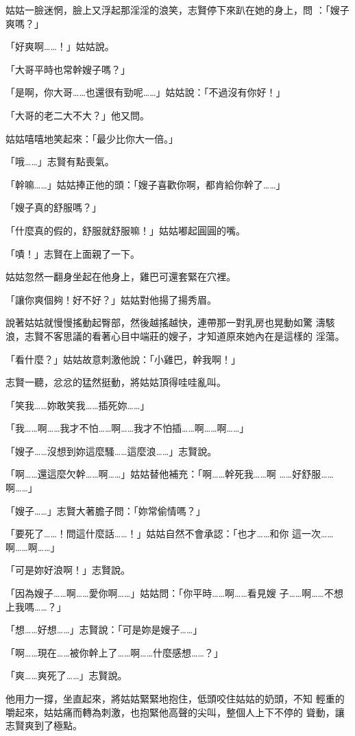 姑姑一臉迷惘，臉上又浮起那淫淫的浪笑，志賢停下來趴在她的身上，問
：「嫂子爽嗎？」

「好爽啊……！」姑姑說。

「大哥平時也常幹嫂子嗎？」

「是啊，你大哥……也還很有勁呢……」姑姑說：「不過沒有你好！」

「大哥的老二大不大？」他又問。

姑姑嘻嘻地笑起來：「最少比你大一倍。」

「哦……」志賢有點喪氣。

「幹嘛……」姑姑捧正他的頭：「嫂子喜歡你啊，都肯給你幹了……」

「嫂子真的舒服嗎？」

「什麼真的假的，舒服就舒服嘛！」姑姑嘟起圓圓的嘴。

「嘖！」志賢在上面親了一下。

姑姑忽然一翻身坐起在他身上，雞巴可還套緊在穴裡。

「讓你爽個夠！好不好？」姑姑對他揚了揚秀眉。

說著姑姑就慢慢搖動起臀部，然後越搖越快，連帶那一對乳房也晃動如驚
濤駭浪，志賢不客思議的看著心目中端莊的嫂子，才知道原來她內在是這樣的
淫蕩。

「看什麼？」姑姑故意刺激他說：「小雞巴，幹我啊！」

志賢一聽，忿忿的猛然挺動，將姑姑頂得哇哇亂叫。

「笑我……妳敢笑我……插死妳……」

「我……啊……我才不怕……啊……我才不怕插……啊……啊……」

「嫂子……沒想到妳這麼騷……這麼浪……」志賢說。

「啊……還這麼欠幹……啊……」姑姑替他補充：「啊……幹死我……啊
……好舒服……啊……」

「嫂子……」志賢大著膽子問：「妳常偷情嗎？」

「要死了……！問這什麼話……！」姑姑自然不會承認：「也才……和你
這一次……啊……啊……」

「可是妳好浪啊！」志賢說。

「因為嫂子……啊……愛你啊……」姑姑問：「你平時……啊……看見嫂
子……啊……不想上我嗎……？」

「想……好想……」志賢說：「可是妳是嫂子……」

「啊……現在……被你幹上了……啊……什麼感想……？」

「爽……爽死了……」志賢說。

他用力一撐，坐直起來，將姑姑緊緊地抱住，低頭咬住姑姑的奶頭，不知
輕重的嚼起來，姑姑痛而轉為刺激，也抱緊他高聲的尖叫，整個人上下不停的
聳動，讓志賢爽到了極點。

